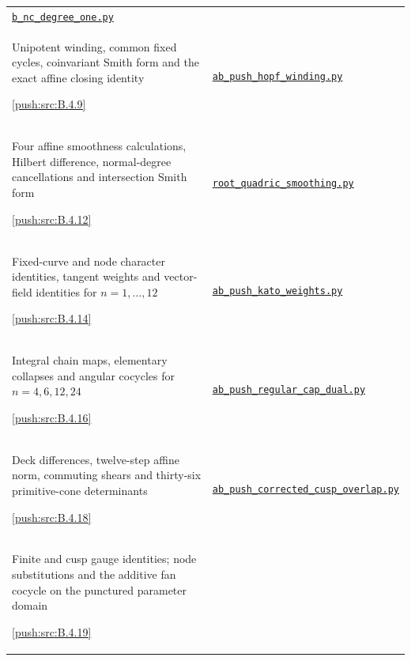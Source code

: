 {\begin{longtable}{@{}>{\raggedright\arraybackslash}p{}>{\raggedright\arraybackslash}p{}@{}}
\href{https://raw.githubusercontent.com/KokunoYumeto/s6-complex-structure-workbench/\SsixRepositoryCommit/pro_returns/S6_02_PUSH_final_20261115T2217Z/S6_02_PUSH/code/b_nc_degree_one.py}{\nolinkurl{b_nc_degree_one.py}} \\[3pt]
Unipotent winding, common fixed cycles, coinvariant Smith form and the exact affine closing identity\par \cref{push:src:B.4.9} &
\href{https://raw.githubusercontent.com/KokunoYumeto/s6-complex-structure-workbench/\SsixRepositoryCommit/pro_returns/S6_02_PUSH_final_20261115T2217Z/S6_02_PUSH/code/ab_push_hopf_winding.py}{\nolinkurl{ab_push_hopf_winding.py}} \\[3pt]
Four affine smoothness calculations, Hilbert difference, normal-degree cancellations and intersection Smith form\par \cref{push:src:B.4.12} &
\href{https://raw.githubusercontent.com/KokunoYumeto/s6-complex-structure-workbench/\SsixRepositoryCommit/pro_returns/S6_02_PUSH_final_20261115T2217Z/S6_02_PUSH/code/root_quadric_smoothing.py}{\nolinkurl{root_quadric_smoothing.py}} \\[3pt]
Fixed-curve and node character identities, tangent weights and vector-field identities for $n=1,\ldots,12$\par \cref{push:src:B.4.14} &
\href{https://raw.githubusercontent.com/KokunoYumeto/s6-complex-structure-workbench/\SsixRepositoryCommit/pro_returns/S6_02_PUSH_final_20261115T2217Z/S6_02_PUSH/code/ab_push_kato_weights.py}{\nolinkurl{ab_push_kato_weights.py}} \\[3pt]
Integral chain maps, elementary collapses and angular cocycles for $n=4,6,12,24$\par \cref{push:src:B.4.16} &
\href{https://raw.githubusercontent.com/KokunoYumeto/s6-complex-structure-workbench/\SsixRepositoryCommit/pro_returns/S6_02_PUSH_final_20261115T2217Z/S6_02_PUSH/code/ab_push_regular_cap_dual.py}{\nolinkurl{ab_push_regular_cap_dual.py}} \\[3pt]
Deck differences, twelve-step affine norm, commuting shears and thirty-six primitive-cone determinants\par \cref{push:src:B.4.18} &
\href{https://raw.githubusercontent.com/KokunoYumeto/s6-complex-structure-workbench/\SsixRepositoryCommit/pro_returns/S6_02_PUSH_final_20261115T2217Z/S6_02_PUSH/code/ab_push_corrected_cusp_overlap.py}{\nolinkurl{ab_push_corrected_cusp_overlap.py}} \\[3pt]
Finite and cusp gauge identities; node substitutions and the additive fan cocycle on the punctured parameter domain\par \cref{push:src:B.4.19} &

\end{longtable}}
